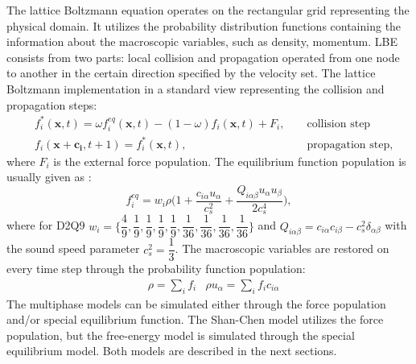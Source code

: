 \documentclass[mathpazo]{cicp}
\begin{document}
The lattice Boltzmann equation operates on the rectangular grid representing the physical domain. It utilizes the
probability distribution functions containing the information about the macroscopic variables, such as density,
momentum. LBE consists from two parts: local collision and propagation operated from one node to another in the certain
direction specified by the velocity set.  The lattice Boltzmann implementation in a standard view representing the
collision and propagation steps:
\begin{equation}
\label{standard:implementation}
\begin{aligned}
&f_i^{*}(\bm{x},t)=\omega f_i^{eq}(\bm{x},t)-(1-\omega) f_i(\bm{x},t) + F_i,&&\text{ collision step}\\
&f_i(\bm{x}+\bm{c_i},t+1)=f_i^{*}(\bm{x},t),&&\text{ propagation step}, 
\end{aligned}
\end{equation}
where $F_i$ is the external force population. The equilibrium function population is usually given as \cite{}:
\begin{equation}
f_i^{eq}=w_i \rho \biggl(1+\frac{c_{i\alpha}u_{\alpha}}{c_s^2}+\frac{Q_{i\alpha\beta}u_{\alpha}u_{\beta}}{2 c_s^4}\biggr),
\end{equation}
where for D2Q9
$w_i=\{\dfrac{4}{9},\dfrac{1}{9},\dfrac{1}{9},\dfrac{1}{9},\dfrac{1}{9},\dfrac{1}{36},\dfrac{1}{36},\dfrac{1}{36},\dfrac{1}{36}\}$
and $Q_{i\alpha\beta}=c_{i\alpha} c_{i\beta} - c_s^2 \delta_{\alpha\beta}$ with the sound speed parameter $c_s^2=\dfrac{1}{3}$. The macroscopic variables are restored on
every time step through the probability function population:
\begin{equation*}
\begin{aligned}
&\rho=\sum_i{f_i}
&\rho u_{\alpha}=\sum_i{f_i c_{i\alpha}}
\end{aligned}
\end{equation*}
The multiphase models can be simulated either through the force population and/or special equilibrium function. The
Shan-Chen model utilizes the force population, but the free-energy model is simulated through the special equilibrium
model. Both models are described in the next sections.
\end{document}
